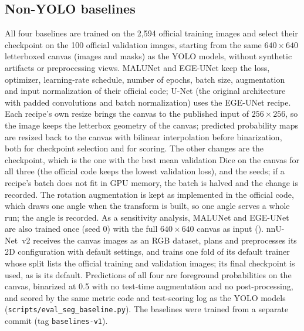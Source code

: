 \documentclass[10pt,a4paper]{article}
\begin{document}
\subsection{Non-YOLO baselines}
All four baselines are trained on the 2,594 official training images and select their checkpoint on the 100 official validation images, starting from the same $640\times640$ letterboxed canvas (images and masks) as the YOLO models, without synthetic artifacts or preprocessing views. MALUNet and EGE-UNet keep the loss, optimizer, learning-rate schedule, number of epochs, batch size, augmentation and input normalization of their official code; U-Net (the original architecture with padded convolutions and batch normalization) uses the EGE-UNet recipe. Each recipe's own resize brings the canvas to the published input of $256\times256$, so the image keeps the letterbox geometry of the canvas; predicted probability maps are resized back to the canvas with bilinear interpolation before binarization, both for checkpoint selection and for scoring. The other changes are the checkpoint, which is the one with the best mean validation Dice on the canvas for all three (the official code keeps the lowest validation loss), and the seeds; if a recipe's batch does not fit in GPU memory, the batch is halved and the change is recorded. The rotation augmentation is kept as implemented in the official code, which draws one angle when the transform is built, so one angle serves a whole run; the angle is recorded. As a sensitivity analysis, MALUNet and EGE-UNet are also trained once (seed 0) with the full $640\times640$ canvas as input (). nnU-Net~v2 receives the canvas images as an RGB dataset, plans and preprocesses its 2D configuration with default settings, and trains one fold of its default trainer whose split lists the official training and validation images; its final checkpoint is used, as is its default. Predictions of all four are foreground probabilities on the canvas, binarized at 0.5 with no test-time augmentation and no post-processing, and scored by the same metric code and test-scoring log as the YOLO models (\texttt{scripts/eval\_seg\_baseline.py}). The baselines were trained from a separate commit (tag \texttt{baselines-v1}).
\end{document}
